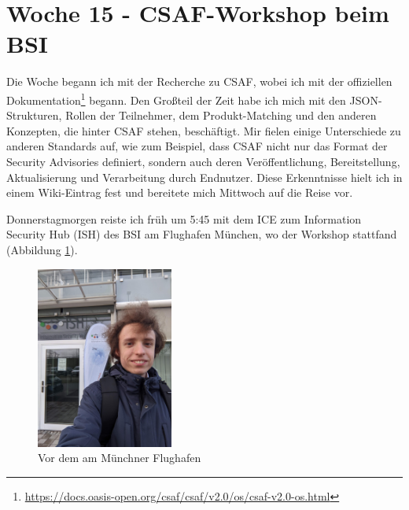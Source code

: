 \section{Woche 15 - CSAF-Workshop beim BSI} \label{sec:bericht-wo-15}


\lweekdaymarginpar{\weekdayMondayShort\ - \weekdayWednesdayShort}

Die Woche begann ich mit der Recherche zu CSAF, wobei ich mit der offiziellen Dokumentation\footnote{\url{https://docs.oasis-open.org/csaf/csaf/v2.0/os/csaf-v2.0-os.html}} begann.
Den Großteil der Zeit habe ich mich mit den JSON-Strukturen, Rollen der Teilnehmer, dem Produkt-Matching und den anderen Konzepten, die hinter CSAF stehen, beschäftigt.
Mir fielen einige Unterschiede zu anderen Standards auf, wie zum Beispiel, dass CSAF nicht nur das Format der Security Advisories definiert, sondern auch deren Veröffentlichung, Bereitstellung, Aktualisierung und Verarbeitung durch Endnutzer.
Diese Erkenntnisse hielt ich in einem Wiki-Eintrag fest und bereitete mich Mittwoch auf die Reise vor.

\sweekdaymarginpar{\weekdayThursdayLong}

Donnerstagmorgen reiste ich früh um 5:45 mit dem ICE zum Information Security Hub (ISH) des BSI am Flughafen München, wo der Workshop stattfand (Abbildung \ref{fig:yan-ish-csaf-muenchen}).

\begin{figure}[htbp] %
    \centering
    \includegraphics[width=0.4\textwidth, keepaspectratio]{res/img/2023-12-14-yan-vor-dem-ish-muenchen}
    \caption{Vor dem  am Münchner Flughafen}
    \label{fig:yan-ish-csaf-muenchen}
\end{figure}

